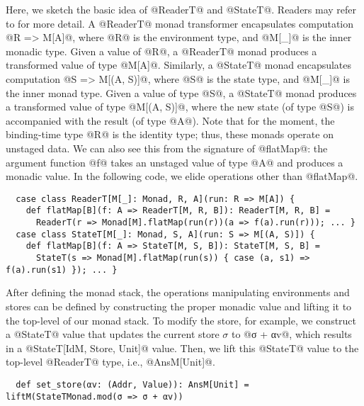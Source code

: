 Here, we sketch the basic idea of @ReaderT@ and @StateT@. Readers may
refer to \cite{DBLP:conf/popl/LiangHJ95, Chiusano:2014:FPS:2688794} for more detail.
A @ReaderT@ monad transformer encapsulates computation @R => M[A]@, where
@R@ is the environment type, and @M[_]@ is the inner monadic type.
Given a value of @R@, a @ReaderT@ monad produces a transformed value of type @M[A]@.
Similarly, a @StateT@ monad encapsulates computation @S => M[(A, S)]@, where
@S@ is the state type, and @M[_]@ is the inner monad type.
Given a value of type @S@, a @StateT@ monad produces a transformed value of type @M[(A, S)]@,
where the new state (of type @S@) is accompanied with the result (of type @A@).
Note that for the moment, the binding-time type @R@ is the identity type; thus,
these monads operate on unstaged data. We can also see this from the
signature of @flatMap@: the argument function @f@ takes an unstaged value of type @A@ and
produces a monadic value. In the following code, we elide operations other than @flatMap@.
\begin{lstlisting}
  case class ReaderT[M[_]: Monad, R, A](run: R => M[A]) {
    def flatMap[B](f: A => ReaderT[M, R, B]): ReaderT[M, R, B] =
      ReaderT(r => Monad[M].flatMap(run(r))(a => f(a).run(r))); ... }
  case class StateT[M[_]: Monad, S, A](run: S => M[(A, S)]) {
    def flatMap[B](f: A => StateT[M, S, B]): StateT[M, S, B] =
      StateT(s => Monad[M].flatMap(run(s)) { case (a, s1) => f(a).run(s1) }); ... }
\end{lstlisting}

After defining the monad stack, the operations manipulating environments
and stores can be defined by constructing the proper monadic value and lifting it to the
top-level of our monad stack. To modify the store, for example, we construct a
@StateT@ value that updates the current store $\sigma$ to @σ + αv@, which
results in a @StateT[IdM, Store, Unit]@ value. Then, we lift this @StateT@
value to the top-level @ReaderT@ type, i.e., @AnsM[Unit]@.
\begin{lstlisting}
  def set_store(αv: (Addr, Value)): AnsM[Unit] = liftM(StateTMonad.mod(σ => σ + αv))
\end{lstlisting}


